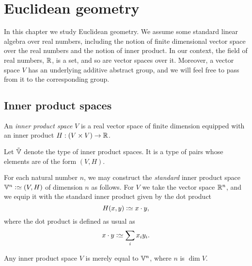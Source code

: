 \chapter{Euclidean geometry}
\label{ch:euclidean}


In this chapter we study Euclidean geometry.  We assume some standard linear
algebra over real numbers, including the notion of finite dimensional vector
space over the real numbers and the notion of inner product.  In our context,
the field of real numbers, $\mathbb{R}$, is a set, and so are vector spaces over it.
Moreover, a vector space $V$ has an underlying additive abstract group, and we
will feel free to pass from it to the corresponding group.

\section{Inner product spaces}

\begin{definition}\label{def:InnerProductSpace}
  An {\em inner product space} $V$ is a real vector space of finite dimension
  equipped with an inner product $H : (V \times V) \to \mathbb{R} $.
\end{definition}

Let ${\tilde {\mathbb V}}$ denote the type of inner product spaces.  It is a type of pairs whose
elements are of the form $(V,H)$.

For each natural number $n$, we may construct the {\em standard} inner product
space $\VV^n \defeq (V,H)$ of dimension $n$ as follows.  For $V$ we take the
vector space $\mathbb{R}^n$, and we equip it with the standard inner product given by
the dot product
$$ H ( x , y) \defeq x \cdot y, $$
where the dot product is defined as usual as
$$ x \cdot y \defeq \sum_i x_i y_i . $$

\begin{theorem}\label{thm:GramSchmidt}
  Any inner product space $V$ is merely equal to $\mathbb V^n$, where $n$ is $\dim V$.
\end{theorem}

